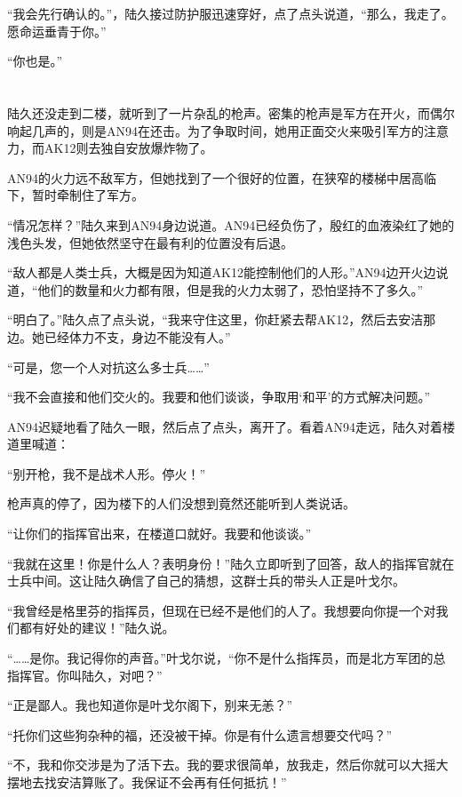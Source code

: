 “我会先行确认的。”，陆久接过防护服迅速穿好，点了点头说道，“那么，我走了。愿命运垂青于你。”

“你也是。”

\section*{}

陆久还没走到二楼，就听到了一片杂乱的枪声。密集的枪声是军方在开火，而偶尔响起几声的，则是AN94在还击。为了争取时间，她用正面交火来吸引军方的注意力，而AK12则去独自安放爆炸物了。

AN94的火力远不敌军方，但她找到了一个很好的位置，在狭窄的楼梯中居高临下，暂时牵制住了军方。

“情况怎样？”陆久来到AN94身边说道。AN94已经负伤了，殷红的血液染红了她的浅色头发，但她依然坚守在最有利的位置没有后退。

“敌人都是人类士兵，大概是因为知道AK12能控制他们的人形。”AN94边开火边说道，“他们的数量和火力都有限，但是我的火力太弱了，恐怕坚持不了多久。”

“明白了。”陆久点了点头说，“我来守住这里，你赶紧去帮AK12，然后去安洁那边。她已经体力不支，身边不能没有人。”

“可是，您一个人对抗这么多士兵……”

“我不会直接和他们交火的。我要和他们谈谈，争取用‘和平’的方式解决问题。”

AN94迟疑地看了陆久一眼，然后点了点头，离开了。看着AN94走远，陆久对着楼道里喊道：

“别开枪，我不是战术人形。停火！”

枪声真的停了，因为楼下的人们没想到竟然还能听到人类说话。

“让你们的指挥官出来，在楼道口就好。我要和他谈谈。”

“我就在这里！你是什么人？表明身份！”陆久立即听到了回答，敌人的指挥官就在士兵中间。这让陆久确信了自己的猜想，这群士兵的带头人正是叶戈尔。

“我曾经是格里芬的指挥员，但现在已经不是他们的人了。我想要向你提一个对我们都有好处的建议！”陆久说。

“……是你。我记得你的声音。”叶戈尔说，“你不是什么指挥员，而是北方军团的总指挥官。你叫陆久，对吧？”

“正是鄙人。我也知道你是叶戈尔阁下，别来无恙？”

“托你们这些狗杂种的福，还没被干掉。你是有什么遗言想要交代吗？”

“不，我和你交涉是为了活下去。我的要求很简单，放我走，然后你就可以大摇大摆地去找安洁算账了。我保证不会再有任何抵抗！”

